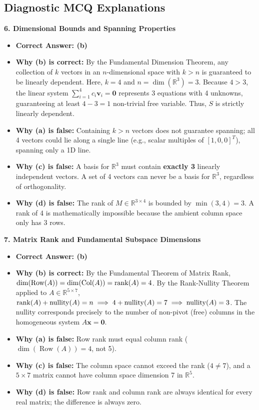 \subsection*{Diagnostic MCQ Explanations}

\textbf{6. Dimensional Bounds and Spanning Properties}
\begin{itemize}
    \item \textbf{Correct Answer: (b)}
    \item \textbf{Why (b) is correct:} By the Fundamental Dimension Theorem, any collection of $k$ vectors in an $n$-dimensional space with $k > n$ is guaranteed to be linearly dependent. Here, $k = 4$ and $n = \dim(\mathbb{R}^3) = 3$. Because $4 > 3$, the linear system $\sum_{i=1}^4 c_i \mathbf{v}_i = \mathbf{0}$ represents 3 equations with 4 unknowns, guaranteeing at least $4 - 3 = 1$ non-trivial free variable. Thus, $S$ is strictly linearly dependent.
    \item \textbf{Why (a) is false:} Containing $k > n$ vectors does not guarantee spanning; all 4 vectors could lie along a single line (e.g., scalar multiples of $[1, 0, 0]^T$), spanning only a 1D line.
    \item \textbf{Why (c) is false:} A basis for $\mathbb{R}^3$ must contain \textbf{exactly 3} linearly independent vectors. A set of 4 vectors can never be a basis for $\mathbb{R}^3$, regardless of orthogonality.
    \item \textbf{Why (d) is false:} The rank of $M \in \mathbb{R}^{3 \times 4}$ is bounded by $\min(3, 4) = 3$. A rank of 4 is mathematically impossible because the ambient column space only has 3 rows.
\end{itemize}

\textbf{7. Matrix Rank and Fundamental Subspace Dimensions}
\begin{itemize}
    \item \textbf{Correct Answer: (b)}
    \item \textbf{Why (b) is correct:} By the Fundamental Theorem of Matrix Rank, $\dim(\operatorname{Row}(A)) = \dim(\operatorname{Col}(A)) = \operatorname{rank}(A) = 4$. By the Rank-Nullity Theorem applied to $A \in \mathbb{R}^{5 \times 7}$, $\operatorname{rank}(A) + \operatorname{nullity}(A) = n \implies 4 + \operatorname{nullity}(A) = 7 \implies \operatorname{nullity}(A) = 3$. The nullity corresponds precisely to the number of non-pivot (free) columns in the homogeneous system $A\mathbf{x} = \mathbf{0}$.
    \item \textbf{Why (a) is false:} Row rank must equal column rank ($\dim(\operatorname{Row}(A)) = 4$, not 5).
    \item \textbf{Why (c) is false:} The column space cannot exceed the rank ($4 \neq 7$), and a $5 \times 7$ matrix cannot have column space dimension 7 in $\mathbb{R}^5$.
    \item \textbf{Why (d) is false:} Row rank and column rank are always identical for every real matrix; the difference is always zero.
\end{itemize}
